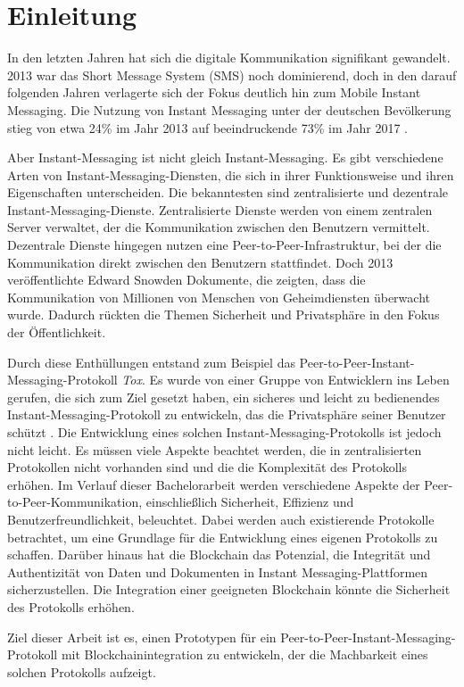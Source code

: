 \chapter{Einleitung}


In den letzten Jahren hat sich die digitale Kommunikation signifikant gewandelt. 2013 war das Short Message System (SMS) noch dominierend, doch in den darauf folgenden Jahren verlagerte sich der Fokus deutlich hin zum Mobile Instant Messaging. Die Nutzung von Instant Messaging unter der deutschen Bevölkerung stieg von etwa 24\% im Jahr 2013 auf beeindruckende 73\% im Jahr 2017 \parencite{Hedda_digiKommunikationVeraendert}. 

Aber Instant-Messaging ist nicht gleich Instant-Messaging. Es gibt verschiedene Arten von Instant-Messaging-Diensten, die sich in ihrer Funktionsweise und ihren Eigenschaften unterscheiden. Die bekanntesten sind zentralisierte und dezentrale Instant-Messaging-Dienste. Zentralisierte Dienste werden von einem zentralen Server verwaltet, der die Kommunikation zwischen den Benutzern vermittelt. Dezentrale Dienste hingegen nutzen eine Peer-to-Peer-Infrastruktur, bei der die Kommunikation direkt zwischen den Benutzern stattfindet. Doch 2013 veröffentlichte Edward Snowden Dokumente, die zeigten, dass die Kommunikation von Millionen von Menschen von Geheimdiensten überwacht wurde\parencite{greenwald_NSA}. Dadurch rückten die Themen Sicherheit und Privatsphäre in den Fokus der Öffentlichkeit.

Durch diese Enthüllungen entstand zum Beispiel das Peer-to-Peer-Instant-Messaging-Protokoll \textit{Tox}. Es wurde von einer Gruppe von Entwicklern ins Leben gerufen, die sich zum Ziel gesetzt haben, ein sicheres und leicht zu bedienendes Instant-Messaging-Protokoll zu entwickeln, das die Privatsphäre seiner Benutzer schützt \parencite{tox_about}. Die Entwicklung eines solchen Instant-Messaging-Protokolls ist jedoch nicht leicht. Es müssen viele Aspekte beachtet werden, die in zentralisierten Protokollen nicht vorhanden sind und die die Komplexität des Protokolls erhöhen. Im Verlauf dieser Bachelorarbeit werden verschiedene Aspekte der Peer-to-Peer-Kommunikation, einschließlich Sicherheit, Effizienz und Benutzerfreundlichkeit, beleuchtet. Dabei werden auch existierende Protokolle betrachtet, um eine Grundlage für die Entwicklung eines eigenen Protokolls zu schaffen. Darüber hinaus hat die Blockchain das Potenzial, die Integrität und Authentizität von Daten und Dokumenten in Instant Messaging-Plattformen sicherzustellen. Die Integration einer geeigneten Blockchain könnte die Sicherheit des Protokolls erhöhen.

Ziel dieser Arbeit ist es, einen Prototypen für ein Peer-to-Peer-Instant-Messaging-Protokoll mit Blockchainintegration zu entwickeln, der die Machbarkeit eines solchen Protokolls aufzeigt.